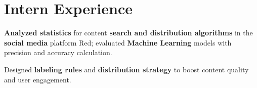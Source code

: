 
\section{\textbf{Intern Experience}}
\resumeSubHeadingListStart

\vspace{-1.0mm}

      \resumeItemListStart
        \item \textbf{Analyzed statistics} for content \textbf{search and distribution algorithms} in the \textbf{social media} platform Red; evaluated \textbf{Machine Learning} models with precision and accuracy calculation.
        \item Designed \textbf{labeling rules} and \textbf{distribution strategy} to boost content quality and user engagement.
    \resumeItemListEnd
    \vspace{-3mm}

    

